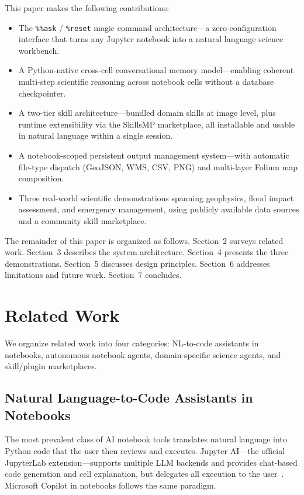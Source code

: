 \documentclass[10pt,twocolumn]{article}
\begin{document}
This paper makes the following contributions:
\begin{itemize}
  \item The \texttt{\%\%ask} / \texttt{\%reset} magic command architecture---a zero-configuration interface that turns any Jupyter notebook into a natural language science workbench.
  \item A Python-native cross-cell conversational memory model---enabling coherent multi-step scientific reasoning across notebook cells without a database checkpointer.
  \item A two-tier skill architecture---bundled domain skills at image level, plus runtime extensibility via the SkillsMP marketplace, all installable and usable in natural language within a single session.
  \item A notebook-scoped persistent output management system---with automatic file-type dispatch (GeoJSON, WMS, CSV, PNG) and multi-layer Folium map composition.
  \item Three real-world scientific demonstrations spanning geophysics, flood impact assessment, and emergency management, using publicly available data sources and a community skill marketplace.
\end{itemize}

The remainder of this paper is organized as follows. Section~2 surveys related work. Section~3 describes the system architecture. Section~4 presents the three demonstrations. Section~5 discusses design principles. Section~6 addresses limitations and future work. Section~7 concludes.

\section{Related Work}

We organize related work into four categories: NL-to-code assistants in notebooks, autonomous notebook agents, domain-specific science agents, and skill/plugin marketplaces.

\subsection{Natural Language-to-Code Assistants in Notebooks}

The most prevalent class of AI notebook tools translates natural language into Python code that the user then reviews and executes. Jupyter AI---the official JupyterLab extension---supports multiple LLM backends and provides chat-based code generation and cell explanation, but delegates all execution to the user~\cite{jupyter_ai}. Microsoft Copilot in notebooks follows the same paradigm.
\end{document}
